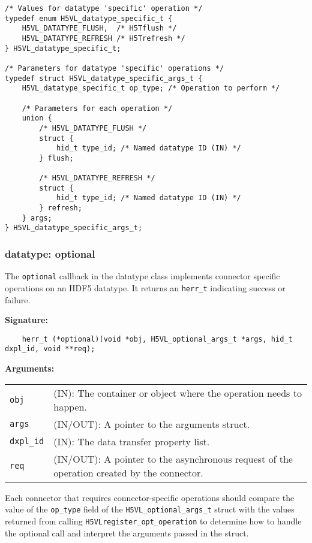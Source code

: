 \begin{lstlisting}
/* Values for datatype 'specific' operation */
typedef enum H5VL_datatype_specific_t {
    H5VL_DATATYPE_FLUSH,  /* H5Tflush */
    H5VL_DATATYPE_REFRESH /* H5Trefresh */
} H5VL_datatype_specific_t;

/* Parameters for datatype 'specific' operations */
typedef struct H5VL_datatype_specific_args_t {
    H5VL_datatype_specific_t op_type; /* Operation to perform */

    /* Parameters for each operation */
    union {
        /* H5VL_DATATYPE_FLUSH */
        struct {
            hid_t type_id; /* Named datatype ID (IN) */
        } flush;

        /* H5VL_DATATYPE_REFRESH */
        struct {
            hid_t type_id; /* Named datatype ID (IN) */
        } refresh;
    } args;
} H5VL_datatype_specific_args_t;
\end{lstlisting}

\subsubsection{datatype: optional}
The \texttt{optional} callback in the datatype class implements connector specific operations on an HDF5 datatype. It returns an \texttt{herr\_t} indicating success or failure.\bigskip 

\begin{mdframed}[style=bgbox]
\textbf{Signature:}
\begin{lstlisting}
    herr_t (*optional)(void *obj, H5VL_optional_args_t *args, hid_t dxpl_id, void **req);
\end{lstlisting}

\textbf{Arguments:}\\
\begin{tabular}{l p{13.5cm}}
  \texttt{obj} & (IN): The container or object where the operation needs to happen.\\
  \texttt{args} & (IN/OUT): A pointer to the arguments struct.\\
  \texttt{dxpl\_id} & (IN): The data transfer property list.\\
  \texttt{req} & (IN/OUT): A pointer to the asynchronous request of the operation created by the connector.\\
\end{tabular}
\end{mdframed}

Each connector that requires connector-specific operations should compare the
value of the {\tt op\_type} field of the {\tt H5VL\_optional\_args\_t} struct
with the values returned from calling {\tt H5VLregister\_opt\_operation} to
determine how to handle the optional call and interpret the arguments passed
in the struct.

